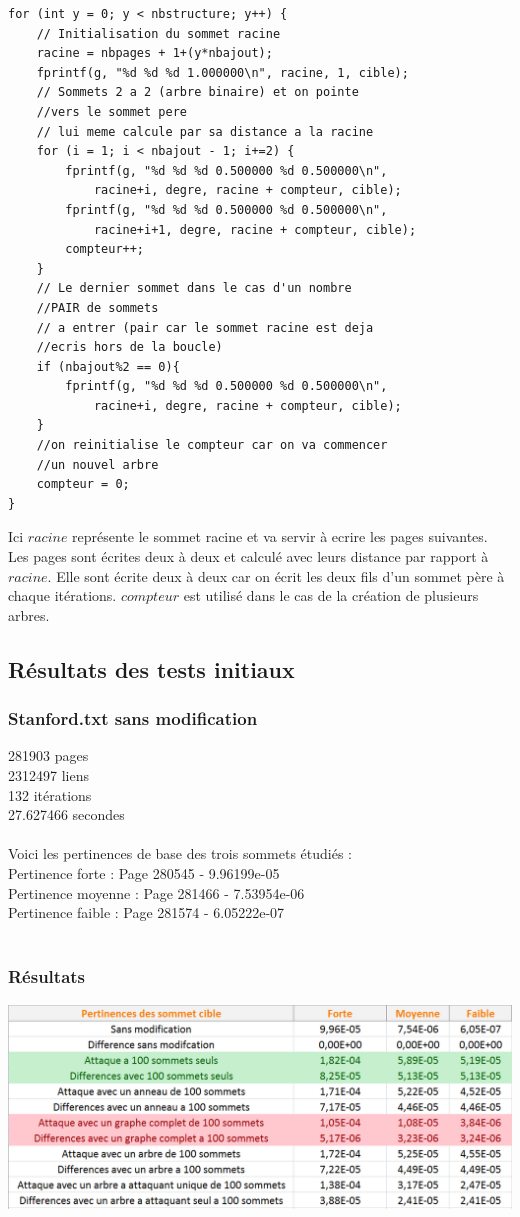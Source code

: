\documentclass[a4paper,11pt]{article}
\begin{document}
	\begin{lstlisting}
for (int y = 0; y < nbstructure; y++) {
	// Initialisation du sommet racine
	racine = nbpages + 1+(y*nbajout);
	fprintf(g, "%d %d %d 1.000000\n", racine, 1, cible);
	// Sommets 2 a 2 (arbre binaire) et on pointe 
	//vers le sommet pere 
	// lui meme calcule par sa distance a la racine	
	for (i = 1; i < nbajout - 1; i+=2) {
		fprintf(g, "%d %d %d 0.500000 %d 0.500000\n", 
			racine+i, degre, racine + compteur, cible);	
		fprintf(g, "%d %d %d 0.500000 %d 0.500000\n", 
			racine+i+1, degre, racine + compteur, cible);	
		compteur++;
	}
	// Le dernier sommet dans le cas d'un nombre 
	//PAIR de sommets 
	// a entrer (pair car le sommet racine est deja 
	//ecris hors de la boucle)
	if (nbajout%2 == 0){ 
		fprintf(g, "%d %d %d 0.500000 %d 0.500000\n", 
			racine+i, degre, racine + compteur, cible);
	}
	//on reinitialise le compteur car on va commencer
	//un nouvel arbre
	compteur = 0;
}
	\end{lstlisting}
	Ici $racine$ représente le sommet racine et va servir à ecrire les pages suivantes. Les pages sont écrites deux à deux et calculé avec leurs distance par rapport à $racine$. Elle sont écrite deux à deux car on écrit les deux fils d'un sommet père à chaque itérations. $compteur$ est utilisé dans le cas de la création de plusieurs arbres.

	\subsection{Résultats des tests initiaux}
		\subsubsection{Stanford.txt sans modification}
			281903 pages\\
			2312497 liens\\
			132 itérations\\
			27.627466 secondes\\
			\\
			Voici les pertinences de base des trois sommets étudiés :\\
			Pertinence forte : Page 280545 - 9.96199e-05\\
			Pertinence moyenne : Page 281466 - 7.53954e-06\\
			Pertinence faible : Page 281574 - 6.05222e-07\\
			\\
		\subsubsection{Résultats}
			\includegraphics[scale = 0.5]{Captures/ranking1.PNG}
\end{document}

